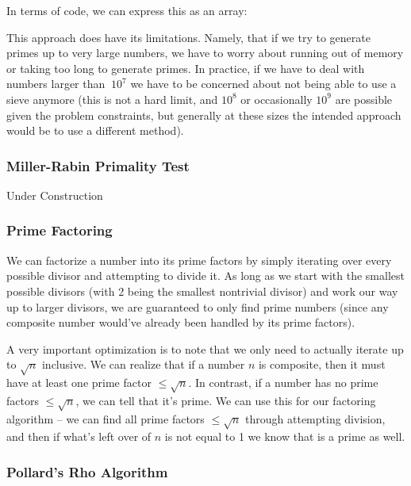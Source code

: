 In terms of code, we can express this as an array:


This approach does have its limitations. Namely, that if we try to generate primes up to very large numbers, we have to worry about running out of memory or taking too long to generate primes. In practice, if we have to deal with numbers larger than $~10^7$ we have to be concerned about not being able to use a sieve anymore (this is not a hard limit, and $10^8$ or occasionally $10^9$ are possible given the problem constraints, but generally at these sizes the intended approach would be to use a different method).

\subsubsection{Miller-Rabin Primality Test}
 

Under Construction

\subsubsection{Prime Factoring}

We can factorize a number into its prime factors by simply iterating over every possible divisor and attempting to divide it. As long as we start with the smallest possible divisors (with 2 being the smallest nontrivial divisor) and work our way up to larger divisors, we are guaranteed to only find prime numbers (since any composite number would've already been handled by its prime factors).

A very important optimization is to note that we only need to actually iterate up to $\sqrt{n}$ inclusive. We can realize that if a number $n$ is composite, then it must have at least one prime factor $\le \sqrt{n}$. In contrast, if a number has no prime factors $\le \sqrt{n}$, we can tell that it's prime. We can use this for our factoring algorithm -- we can find all prime factors $\le \sqrt{n}$ through attempting division, and then if what's left over of $n$ is not equal to 1 we know that is a prime as well.


\subsubsection{Pollard's Rho Algorithm}

